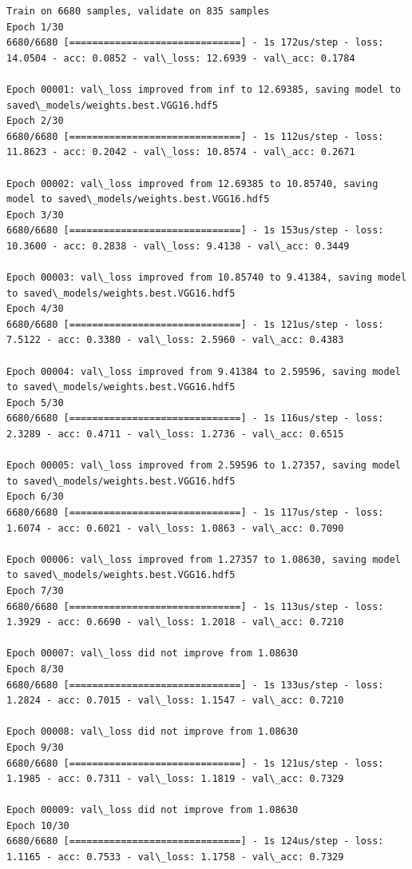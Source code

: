 \documentclass[11pt]{article}
\begin{document}
    \begin{Verbatim}[commandchars=\\\{\}]
Train on 6680 samples, validate on 835 samples
Epoch 1/30
6680/6680 [==============================] - 1s 172us/step - loss: 14.0504 - acc: 0.0852 - val\_loss: 12.6939 - val\_acc: 0.1784

Epoch 00001: val\_loss improved from inf to 12.69385, saving model to saved\_models/weights.best.VGG16.hdf5
Epoch 2/30
6680/6680 [==============================] - 1s 112us/step - loss: 11.8623 - acc: 0.2042 - val\_loss: 10.8574 - val\_acc: 0.2671

Epoch 00002: val\_loss improved from 12.69385 to 10.85740, saving model to saved\_models/weights.best.VGG16.hdf5
Epoch 3/30
6680/6680 [==============================] - 1s 153us/step - loss: 10.3600 - acc: 0.2838 - val\_loss: 9.4138 - val\_acc: 0.3449

Epoch 00003: val\_loss improved from 10.85740 to 9.41384, saving model to saved\_models/weights.best.VGG16.hdf5
Epoch 4/30
6680/6680 [==============================] - 1s 121us/step - loss: 7.5122 - acc: 0.3380 - val\_loss: 2.5960 - val\_acc: 0.4383

Epoch 00004: val\_loss improved from 9.41384 to 2.59596, saving model to saved\_models/weights.best.VGG16.hdf5
Epoch 5/30
6680/6680 [==============================] - 1s 116us/step - loss: 2.3289 - acc: 0.4711 - val\_loss: 1.2736 - val\_acc: 0.6515

Epoch 00005: val\_loss improved from 2.59596 to 1.27357, saving model to saved\_models/weights.best.VGG16.hdf5
Epoch 6/30
6680/6680 [==============================] - 1s 117us/step - loss: 1.6074 - acc: 0.6021 - val\_loss: 1.0863 - val\_acc: 0.7090

Epoch 00006: val\_loss improved from 1.27357 to 1.08630, saving model to saved\_models/weights.best.VGG16.hdf5
Epoch 7/30
6680/6680 [==============================] - 1s 113us/step - loss: 1.3929 - acc: 0.6690 - val\_loss: 1.2018 - val\_acc: 0.7210

Epoch 00007: val\_loss did not improve from 1.08630
Epoch 8/30
6680/6680 [==============================] - 1s 133us/step - loss: 1.2824 - acc: 0.7015 - val\_loss: 1.1547 - val\_acc: 0.7210

Epoch 00008: val\_loss did not improve from 1.08630
Epoch 9/30
6680/6680 [==============================] - 1s 121us/step - loss: 1.1985 - acc: 0.7311 - val\_loss: 1.1819 - val\_acc: 0.7329

Epoch 00009: val\_loss did not improve from 1.08630
Epoch 10/30
6680/6680 [==============================] - 1s 124us/step - loss: 1.1165 - acc: 0.7533 - val\_loss: 1.1758 - val\_acc: 0.7329


\end{Verbatim}
\end{document}
